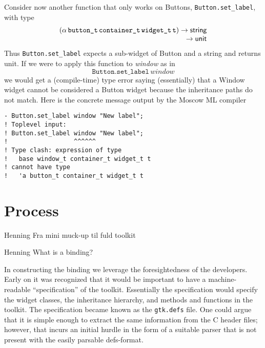 \documentclass[workingdraft,endnotes]{usetex-v1}
\begin{document}
Consider now another function that only works on Buttons, \texttt{Button.set\_label}, with type
\begin{displaymath}\begin{array}{l}
(\tApp{\tApp{\tApp{\tApp{\alpha}{\tWitness{button}}}{\tWitness{container}}}{\tWitness{widget}}}{\tName{t}})
\rightarrow
\tString
\\
\multicolumn{1}{r}{\rightarrow\tUnit}
\end{array}\end{displaymath}
Thus \texttt{Button.set\_label} expects a sub-widget of Button and a string and returns unit.
If we were to apply this function to \textit{window} as in
\begin{displaymath}
\texttt{Button.set\_label}\,\textit{window}
\end{displaymath}
we would get a (compile-time) type error saying (essentially) that
a Window widget cannot be considered a Button widget because the
inheritance paths do not match. Here is the concrete message output
by the Moscow ML compiler
\begin{verbatim}
- Button.set_label window "New label";
! Toplevel input:
! Button.set_label window "New label";
!                  ^^^^^^
! Type clash: expression of type
!   base window_t container_t widget_t t
! cannot have type
!   'a button_t container_t widget_t t
\end{verbatim}


\section{Process}
\label{sec:process}

\begin{ednote}{Henning}
  Fra mini muck-up til fuld toolkit
\end{ednote}

\begin{ednote}{Henning}
  What is a binding?
\end{ednote}

In constructing the \mgtk binding we leverage the foresightedness of
the \gtk developers. Early on it was recognized that it would be
important to have a machine-readable ``specification'' of the toolkit.
Essentially the specification would specify the widget classes, the
inheritance hierarchy, and methods and functions in the toolkit. The
specification became known as the \texttt{gtk.defs} file. One could
argue that it is simple enough to extract the same information from
the C header files; however, that incurs an initial hurdle in the
form of a suitable parser that is not present with the easily parsable
defs-format.
\end{document}
